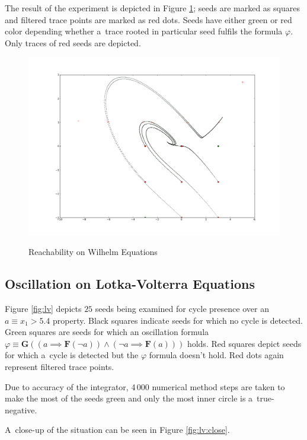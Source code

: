 \documentclass[12pt,twoside,draft]{fithesis}
\newcommand{\bF}{\mathbf{F}}
\newcommand{\bG}{\mathbf{G}}
\begin{document}
The result of the experiment is depicted in Figure \ref{fig:wh};
seeds are marked as squares and filtered trace points are marked
as red dots. Seeds have either green or red color depending whether
a~trace rooted in particular seed fulfils the formula $\varphi$.
Only traces of red seeds are depicted.
\begin{figure}[h]
\center
\includegraphics[scale=0.31,draft=false]{wh_reachability}
\label{fig:wh}
\caption{Reachability on Wilhelm Equations}
\end{figure}

\subsection*{Oscillation on Lotka-Volterra Equations}
Figure \ref{fig:lv} depicts $25$ seeds being examined for cycle presence
over an~$a\equiv x_1>5.4$ property. Black squares indicate seeds
for which no cycle is detected. Green squares are seeds for which
an oscillation formula
$\varphi\equiv\bG((a\implies\bF(\neg a))\wedge(\neg a\implies\bF(a)))$
holds. Red squares depict seeds for which a~cycle is detected but the
$\varphi$ formula doesn't hold. Red dots again represent filtered trace
points.

Due to accuracy of the integrator, 4\,000 numerical method
steps are taken to make the most of the seeds green and only the most
inner circle is a~true-negative. 

A~close-up of the situation can be seen in Figure \ref{fig:lv:close}.
\end{document}
